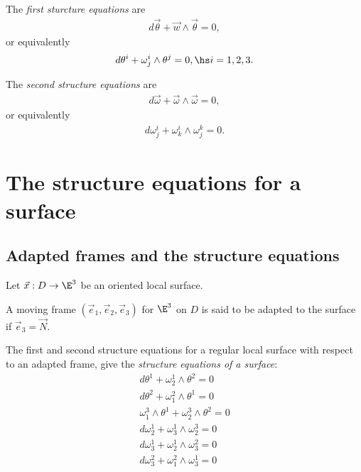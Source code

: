 \documentclass{article}
\begin{document}
\begin{theorem}
    The \emph{first sturcture equations} are 
    \begin{align*}
        d\vec\theta + \vec w \wedge \vec \theta = 0,
    \end{align*}
    or equivalently 
    \begin{align*}
        d\theta^i + \omega_j^i \wedge \theta^j = 0,\hs i=1,2,3.
    \end{align*}
\end{theorem}

\begin{theorem}
    The \emph{second structure equations} are 
    \begin{align*}
        d\vec\omega + \vec \omega \wedge\vec \omega = 0,
    \end{align*}
    or equivalently 
    \begin{align*}
        d\omega_j^i + \omega_k^i\wedge\omega_j^k=0.
    \end{align*}
\end{theorem}

\section{The structure equations for a surface}

\subsection{Adapted frames and the structure equations}

Let $\vec x: D \to \E^3$ be an oriented local surface.

\begin{definition}
    A moving frame $(\vec e_1, \vec e_2, \vec e_3)$ for $\E^3$ on $D$
    is said to be adapted to the surface if $\vec e_3 = \vec N$.
\end{definition}

\begin{proposition}[Notes 11.2]
    The first and second structure equations for a regular local surface 
    with respect to an adapted frame, give the \emph{structure equations
    of a surface}:
    \begin{align*}
        d\theta^1 + \omega_2^1\wedge\theta^2 = 0\\
        d\theta^2 + \omega_1^2\wedge\theta^1 = 0\\
        \omega_1^3\wedge\theta^1 + \omega_2^3\wedge\theta^2 = 0\\
        d\omega_2^1+\omega_3^1\wedge\omega_2^3 = 0\\
        d\omega_3^1 + \omega_2^1 \wedge \omega_3^2 = 0\\
        d\omega_3^2 + \omega_1^2 \wedge \omega_3^1 = 0
    \end{align*}
\end{proposition}
\end{document}
